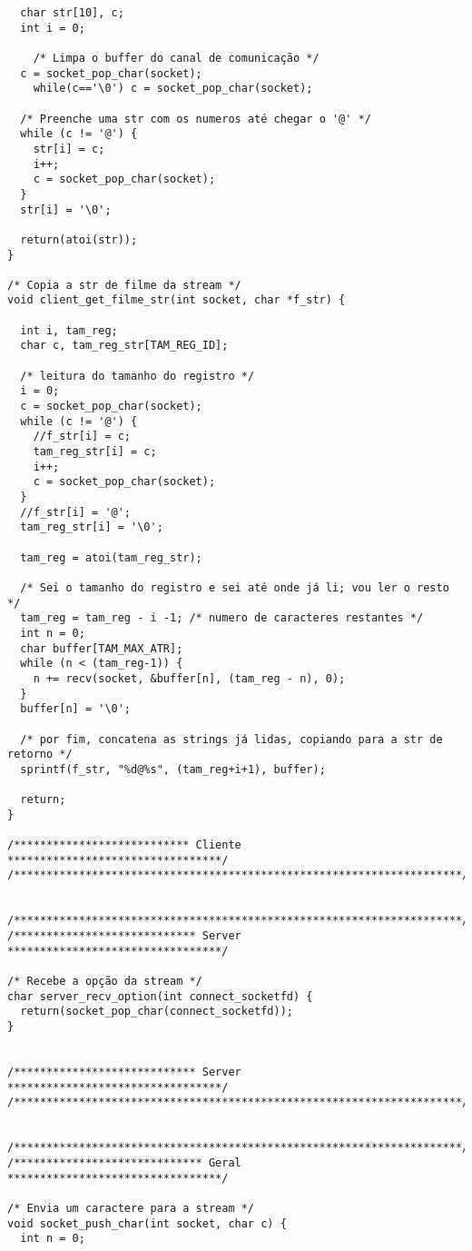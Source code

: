 \documentclass[11pt,twoside]{article}
\begin{document}
\begin{verbatim}
  char str[10], c;
  int i = 0;

	/* Limpa o buffer do canal de comunicação */
  c = socket_pop_char(socket);
	while(c=='\0') c = socket_pop_char(socket);

  /* Preenche uma str com os numeros até chegar o '@' */
  while (c != '@') {
    str[i] = c;
    i++;
    c = socket_pop_char(socket);
  }
  str[i] = '\0';
	
  return(atoi(str));
}

/* Copia a str de filme da stream */
void client_get_filme_str(int socket, char *f_str) {
	
  int i, tam_reg;
  char c, tam_reg_str[TAM_REG_ID];

  /* leitura do tamanho do registro */
  i = 0;
  c = socket_pop_char(socket);
  while (c != '@') {
    //f_str[i] = c;
    tam_reg_str[i] = c;
    i++;
    c = socket_pop_char(socket);
  }
  //f_str[i] = '@';
  tam_reg_str[i] = '\0';

  tam_reg = atoi(tam_reg_str);

  /* Sei o tamanho do registro e sei até onde já li; vou ler o resto */
  tam_reg = tam_reg - i -1; /* numero de caracteres restantes */
  int n = 0;
  char buffer[TAM_MAX_ATR];
  while (n < (tam_reg-1)) {
    n += recv(socket, &buffer[n], (tam_reg - n), 0);
  }
  buffer[n] = '\0';
	
  /* por fim, concatena as strings já lidas, copiando para a str de retorno */
  sprintf(f_str, "%d@%s", (tam_reg+i+1), buffer);
	
  return;
}

/*************************** Cliente *********************************/
/*********************************************************************/


/*********************************************************************/
/**************************** Server *********************************/

/* Recebe a opção da stream */
char server_recv_option(int connect_socketfd) {
  return(socket_pop_char(connect_socketfd));
}


/**************************** Server *********************************/
/*********************************************************************/


/*********************************************************************/
/***************************** Geral *********************************/

/* Envia um caractere para a stream */
void socket_push_char(int socket, char c) {
  int n = 0;
	

\end{verbatim}
\end{document}
